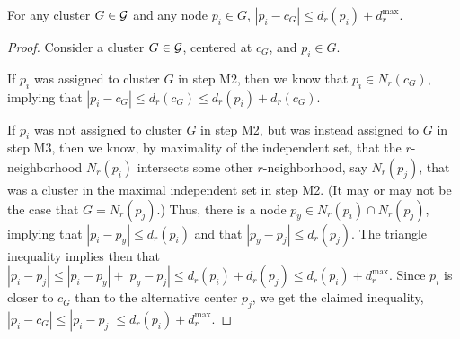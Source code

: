 \begin{lemma}
For any cluster $G\in \mathcal{G}$ and any node $p_{i}\in G$, $|p_{i} - c_G| \leq d_r(p_{i})+d_r^{\max}$.   %
\label{lem:local-lemma}
\end{lemma}
\begin{proof}
Consider a cluster $G\in\mathcal{G}$, centered at $c_G$, and $p_{i}\in G$. 

If $p_{i}$ was assigned to cluster $G$ in step M2, then we know that $p_{i}\in N_r(c_G)$, implying that $|p_{i} - c_G| \leq d_r(c_G) \leq d_r(p_{i})+ d_r(c_G)$.


If $p_{i}$ was not assigned to cluster $G$ in step M2, but was instead assigned to $G$ in step M3, then we know, by maximality of the independent set, that the $r$-neighborhood $N_r(p_i)$ intersects some other $r$-neighborhood, say $N_r(p_j)$, that was a cluster in the maximal independent set in step M2.  (It may or may not be the case that $G=N_r(p_j)$.)  
Thus, there is a node $p_y \in N_r(p_i)\cap N_r(p_j)$, implying that $|p_i - p_y|\leq d_r(p_i)$ and that $|p_y - p_j|\leq d_r(p_j)$.  The triangle inequality implies then that $|p_i-p_j|\leq |p_i-p_y|+|p_y-p_j|\leq d_r(p_i)+d_r(p_j)\leq d_r(p_i)+d_r^{\max}$.  
Since $p_i$ is closer to $c_G$ than to the alternative center $p_j$, we get the claimed inequality, 
$|p_i-c_G|\leq |p_i-p_j|\leq d_r(p_i)+d_r^{\max}$. 
\end{proof}

